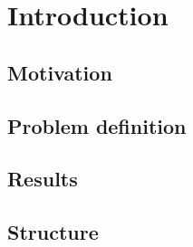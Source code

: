 
\chapter{Introduction}

\section{Motivation}

\section{Problem definition}

\section{Results} %

\section{Structure} %
